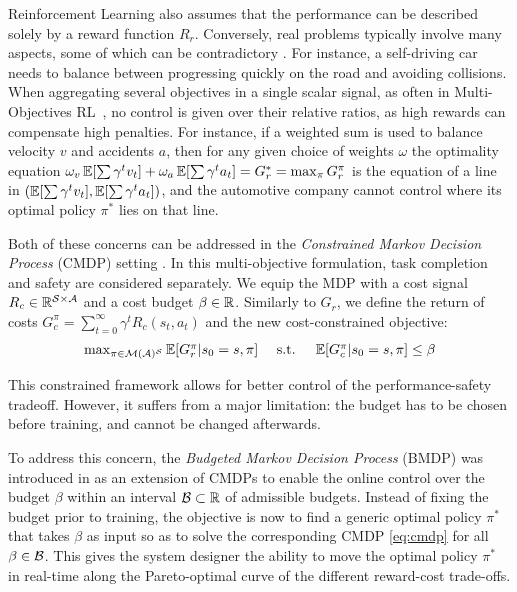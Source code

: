 \documentclass{article}
\begin{document}
Reinforcement Learning also assumes that the performance can be described solely by a reward function $R_r$. Conversely, real problems typically involve many aspects, some of which can be contradictory \citep{ChunmingLiu2014}. For instance, a self-driving car needs to balance between progressing quickly on the road and avoiding collisions. When aggregating several objectives in a single scalar signal, as often in Multi-Objectives RL~\citep{Roijers2013ASO}, no control is given over their relative ratios, as high rewards can compensate high penalties. For instance, if a weighted sum is used to balance velocity $v$ and accidents $a$, then for any given choice of weights $\omega$ the optimality equation $\omega_v\operatorname*{\mathbb{E}}[\sum\gamma^t v_t] + \omega_a\operatorname*{\mathbb{E}}[\sum\gamma^t a_t] = G_r^* = \max_\pi G^\pi_r$ is the equation of a line in $(\operatorname*{\mathbb{E}}[\sum\gamma^t v_t], \operatorname*{\mathbb{E}}[\sum\gamma^t a_t])$, and the automotive company cannot control where its optimal policy $\pi^*$ lies on that line.

Both of these concerns can be addressed in the \emph{Constrained Markov Decision Process} (CMDP) setting \citep{BEUTLER1985236,Altman95constrainedmarkov}. In this multi-objective formulation, task completion and safety are considered separately. We equip the MDP with a cost signal $R_c \in \mathbb{R}^{\mathcal{S}\times \mathcal{A}}$ and a cost budget $\beta\in\mathbb{R}$. Similarly to $G_r$, we define the return of costs $G_c^\pi = \sum_{t=0}^\infty \gamma^t R_c(s_t, a_t)$ and the new cost-constrained objective:
\begin{equation}
\label{eq:cmdp}
\begin{array}{lcr}
 \max_{\pi\in\mathcal{M}(\mathcal{A})^{\mathcal{S}}} \operatorname*{\mathbb{E}}[G_r^\pi | s_0=s, \pi] & \text{ s.t. } & \operatorname*{\mathbb{E}}[G_c^\pi | s_0=s, \pi] \leq \beta
\end{array}
\end{equation}

This constrained framework allows for better control of the performance-safety tradeoff. However, it suffers from a major limitation: the budget has to be chosen before training, and cannot be changed afterwards.

To address this concern, the \emph{Budgeted Markov Decision Process} (BMDP) was introduced in \citep{Boutilier_Lu:uai16} as an extension of CMDPs to enable the online control over the budget $\beta$ within an interval $\mathcal{B} \subset \mathbb{R}$ of admissible budgets. Instead of fixing the budget prior to training, the objective is now to find a generic optimal policy $\pi^*$ that takes $\beta$ as input so as to solve the corresponding CMDP \eqref{eq:cmdp} for all $\beta\in\mathcal{B}$. This gives the system designer the ability to move the optimal policy $\pi^*$ in real-time along the Pareto-optimal curve of the different reward-cost trade-offs.
\end{document}
